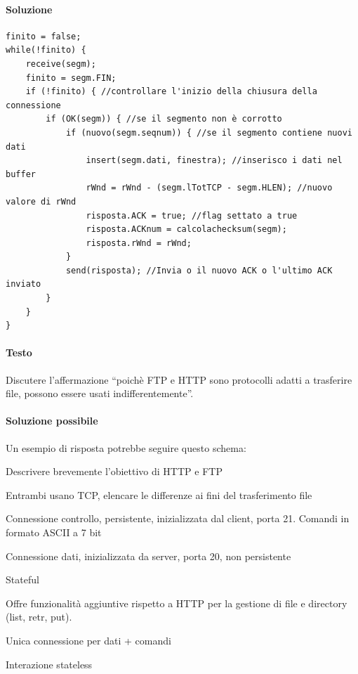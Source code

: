 \documentclass[10pt]{article}
\begin{document}
\paragraph{Soluzione}
\begin{verbatim}
finito = false;
while(!finito) {
    receive(segm);
    finito = segm.FIN;
    if (!finito) { //controllare l'inizio della chiusura della connessione
        if (OK(segm)) { //se il segmento non è corrotto
            if (nuovo(segm.seqnum)) { //se il segmento contiene nuovi dati
                insert(segm.dati, finestra); //inserisco i dati nel buffer
                rWnd = rWnd - (segm.lTotTCP - segm.HLEN); //nuovo valore di rWnd
                risposta.ACK = true; //flag settato a true
                risposta.ACKnum = calcolachecksum(segm);
                risposta.rWnd = rWnd;
            }
            send(risposta); //Invia o il nuovo ACK o l'ultimo ACK inviato
        }
    }
}
\end{verbatim}
\pagebreak
\paragraph{Testo} Discutere l’affermazione “poichè FTP e HTTP sono protocolli adatti a trasferire file, possono essere usati indifferentemente”.
\paragraph{Soluzione possibile} Un esempio di risposta potrebbe seguire questo schema:
\begin{list}{-}{}
\item Descrivere brevemente l'obiettivo di HTTP e FTP
\item Entrambi usano TCP, elencare le differenze ai fini del trasferimento file
\end{list}
\begin{list}{}{FTP}
\item Connessione controllo, persistente, inizializzata dal client, porta 21. Comandi in formato ASCII a 7 bit
\item Connessione dati, inizializzata da server, porta 20, non persistente
\item Stateful
\item Offre funzionalità aggiuntive rispetto a HTTP per la gestione di file e directory (list, retr, put).
\end{list}
\begin{list}{}{HTTP}
\item Unica connessione per dati + comandi
\item Interazione stateless
\end{list}
\end{document}
